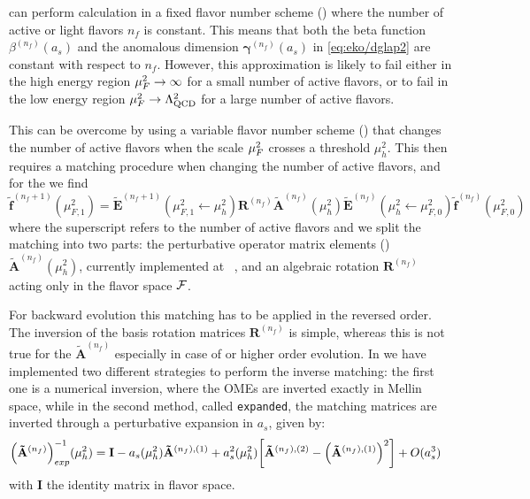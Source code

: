\eko{} can perform calculation in a fixed flavor number scheme (\ffns{}) where
the number of active or light flavors $n_f$ is constant. This means that both
the beta function $\beta^{(n_f)}(a_s)$ and the anomalous dimension
$\bm{\gamma}^{(n_f)}(a_s)$ in \cref{eq:eko/dglap2} are constant with respect to
$n_f$.
However, this approximation is likely to fail either in the high energy region
$\mu_F^2 \to \infty$ for a small number of active flavors, or to fail in the low
energy region $\mu_F^2 \to \Lambda_{\text{QCD}}^2$ for a large number of active
flavors.

This can be overcome by using a variable flavor number scheme (\vfns{}) that
changes the number of active flavors when the scale $\mu_F^2$ crosses a
threshold $\mu_h^2$.
This then requires a matching procedure when changing the number of active
flavors, and for the \pdfs we find
\begin{equation}
    \tilde{\mathbf{f}}^{(n_f+1)}(\mu_{F,1}^2)= \tilde{\mathbf{E}}^{(n_f+1)}(\mu_{F,1}^2\leftarrow \mu_{h}^2) {\mathbf{R}^{(n_f)}} \tilde{\mathbf{A}}^{(n_f)}(\mu_{h}^2) \tilde{\mathbf{E}}^{(n_f)}(\mu_{h}^2\leftarrow \mu_{F,0}^2) \tilde{\mathbf{f}}^{(n_f)}(\mu_{F,0}^2)
    \label{eq:eko/matching}
\end{equation}
where the superscript refers to the number of active flavors and we split the matching into two
parts: the perturbative operator matrix elements (\ome{}) $\tilde{\mathbf{A}}^{(n_f)}(\mu_{h}^2)$,
currently implemented at \nnlo{}~\cite{Buza_1998}, and an algebraic rotation ${\mathbf{R}^{(n_f)}}$ acting
only in the flavor space $\mathcal{F}$.

For backward evolution this matching has to be applied in the reversed order.
The inversion of the basis rotation matrices $\mathbf{R}^{(n_f)}$ is simple,
whereas this is not true for the \ome{} $\mathbf{\tilde A}^{(n_f)}$ especially
in case of \nnlo{} or higher order evolution.
In \eko{} we have implemented two different strategies to perform the inverse
matching: the first one is a numerical inversion, where the OMEs are inverted
exactly in Mellin space, while in the second method, called \texttt{expanded},
the matching matrices are inverted through a perturbative expansion in $a_s$,
given by:
\begin{align}
    \qty(\mathbf{\tilde A}^{(n_f)})_{exp}^{-1}(\mu_{h}^2) &= \mathbf{I} - a_s(\mu_{h}^2) \mathbf{\tilde A}^{(n_f),(1)} + a_s^2(\mu_{h}^2) \qty[ \mathbf{\tilde A}^{(n_f),(2)} - \qty(\mathbf{\tilde A}^{(n_f),(1)})^2 ] + O(a_s^3)
    \label{eq:eko/invmatchingexp}
\end{align}
with $\mathbf{I}$ the identity matrix in flavor space.
